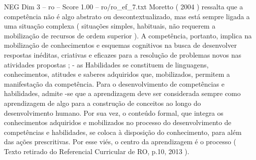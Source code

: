 \begin{textsample}{NEG Dim 3 – ro – Score 1.00 – ro/ro\_ef\_7.txt}
Moretto ( 2004 ) ressalta que a competência não é algo abstrato ou descontextualizado, mas está sempre ligada a uma situação complexa ( situações simples, habituais, não requerem a mobilização de recursos de ordem superior ).
A competência, portanto, implica na mobilização de conhecimentos e esquemas cognitivos na busca de desenvolver respostas inéditas, criativas e eficazes para a resolução de problemas novos nas atividades propostas ; - as Habilidades se constituem de linguagens, conhecimentos, atitudes e saberes adquiridos que, mobilizados, permitem a manifestação da competência.
Para o desenvolvimento de competências e habilidades, admite -se que a aprendizagem deve ser considerada sempre como aprendizagem de algo para a construção de conceitos ao longo do desenvolvimento humano.
Por sua vez, o conteúdo formal, que integra os conhecimentos adquiridos e mobilizados no processo do desenvolvimento de competências e habilidades, se coloca à disposição do conhecimento, para além das ações prescritivas.
Por esse viés, o centro da aprendizagem é o processo ( Texto retirado do Referencial Curricular de RO, p.10, 2013 ).

\end{textsample}

